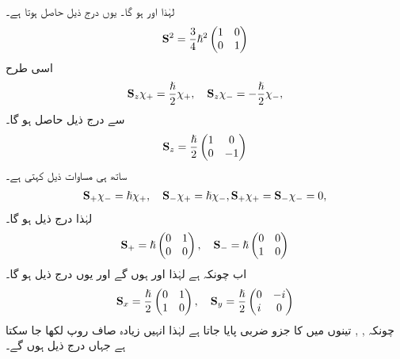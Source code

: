  لہٰذا  اور  ہو گا۔  یوں درج ذیل حاصل ہوتا ہے۔
 \begin{align} 
\bold{S}^2= \frac{3}{4}\hslash^2 \begin{pmatrix} 1&0 \\ 0&1 \end{pmatrix} 
 \end{align} 
اسی طرح 
\begin{align} 
 \bold{S}_{z}\chi_{+}=\frac{\hslash}{2}\chi_{+}, \quad \bold{S}_{z} \chi_{-}=-\frac{\hslash}{2}\chi_{-}, 
 \end{align}
سے درج ذیل حاصل ہو گا۔
\begin{align} 
 \bold{S}_{z}= \frac{\hslash}{2}\begin{pmatrix} 1&0 \\ 0&-1 \end{pmatrix} 
 \end{align}
ساتھ ہی مساوات   ذیل کہتی ہے۔
\begin{align*} 
 \bold{S}_{+} \chi_{-}=\hslash \chi_+, \quad \bold{S}_{-}\chi_{+}=\hslash \chi_- , \bold{S}_{+} \chi_{+}= \bold{S}_{-} \chi_{-}=0, 
 \end{align*}
لہٰذا درج ذیل ہو گا۔
\begin{align} 
 \bold{S}_{+}=\hslash\begin{pmatrix} 0&1 \\ 0&0 \end{pmatrix} , \quad \bold{S}_{-}=\hslash\begin{pmatrix}0&0 \\ 1&0 \end{pmatrix} 
 \end{align}
 اب     چونکہ   ہے لہٰذا     اور  ہوں گے اور یوں  درج ذیل ہو گا۔
\begin{align} 
 \bold{S}_{x}=\frac{\hslash}{2}\begin{pmatrix} 0&1 \\1&0 \end{pmatrix} , \quad \bold{S}_{y}=\frac{\hslash}{2}\begin{pmatrix} 0&-i \\ i& 0 \end{pmatrix}
 \end{align}
چونکہ  ,  ,  تینوں میں  کا جزو  ضربی پایا جاتا ہے لہٰذا انہیں زیادہ صاف روپ  لکھا جا سکتا ہے جہاں درج ذیل ہوں گے۔
